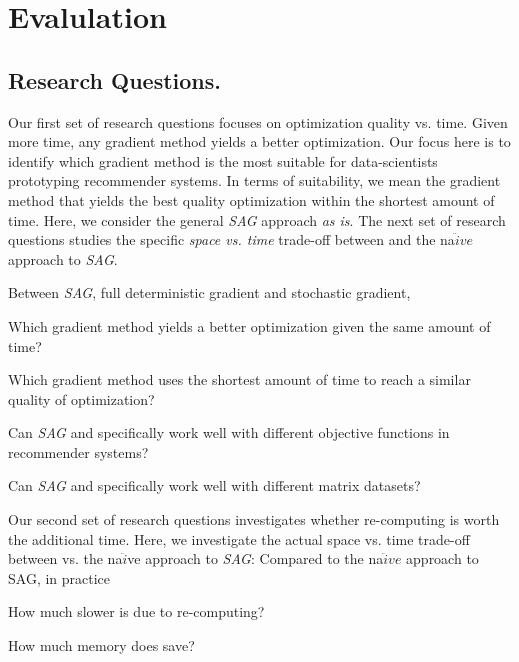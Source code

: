 \section{Evalulation}


\subsection{Research Questions.}

Our first set of research questions focuses on optimization quality vs. time.
Given more time, any gradient method yields a better optimization.  
Our focus here is to identify which gradient method is the most suitable for data-scientists prototyping recommender systems.
In terms of suitability, we mean the gradient method that yields the best quality optimization within the shortest amount of time.
Here, we consider the general \emph{SAG} approach \emph{as is}. 
The next set of research questions studies the specific \emph{space vs. time} trade-off between \tool and the na$\ddot{i}ve$ approach to \emph{SAG}.

Between \emph{SAG}, full deterministic gradient and stochastic gradient,
\begin{sloppy}
\begin{compactenum}
\item Which gradient method yields a better optimization given the same amount of time?
\item Which gradient method uses the shortest amount of time to reach a similar quality of optimization?
\item Can \emph{SAG} and specifically \tool work well with different objective functions in recommender systems?
\item Can \emph{SAG} and specifically \tool work well with different matrix datasets?
\end{compactenum}
\end{sloppy}


Our second set of research questions investigates whether re-computing is worth the additional time.
Here, we investigate the actual space vs. time trade-off between \tool vs. the na$\ddot{i}$ve approach to \emph{SAG}:
Compared to the na$\ddot{i}ve$ approach to SAG, in practice
\begin{sloppy}
\begin{compactitem}
\item How much slower is \tool due to re-computing?
\item How much memory does \tool save?
\end{compactitem}
\end{sloppy}









